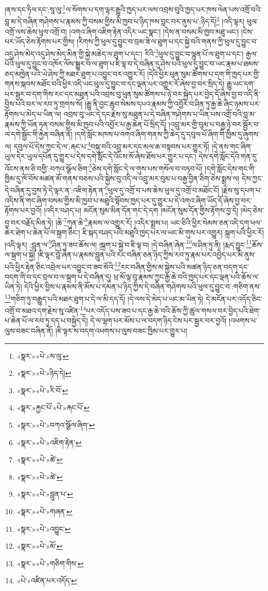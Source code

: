 །ནས་དང་ཏིལ་དང་:སཱ་ལུ་\footnote{«སྣར་»«པེ་»ས་ལུ་}ལ་སོགས་པ་དག་ལྟར་རྒྱུའི་ཁྱད་པར་ལས་འབྲས་བུའི་ཁྱད་པར་ཁས་ལེན་པས་འགྲོ་བའི་བླ་མ་དེ་བཞིན་གཤེགས་པ་རྣམས་ཀྱི་བསམ་གྱིས་མི་ཁྱབ་པ་ཉིད་ཁས་བླང་བར་ནུས་པ་:ཉིད་དོ།\footnote{«སྣར་»«པེ་»ཉིད་དེ།} །འདི་ལྟར། ཕུལ་འགྲོ་ལས་ཆེས་ཕུལ་འགྲོ་བ། །འགའ་ཞིག་འཇིག་རྟེན་འདིར་ཡང་སྣང་། །དེས་ན་བསམ་མི་ཁྱབ་མཐུ་ཡང་། །ངེས་པར་ཡོད་ཅེས་རྟོགས་པར་གྱིས། །རིགས་ཀྱི་ཕུལ་དུ་བྱུང་བ་བྲམ་ཟེ་ལ་ཐུག་པ་དང་སྐྱེ་བའི་གནས་ཀྱི་ཕུལ་དུ་བྱུང་བ་འདུ་ཤེས་མེད་འདུ་ཤེས་མེད་མིན་གྱི་སྐྱེ་མཆེད་ལ་ཐུག་པ་དང་། རིའི་\footnote{«སྣར་»«པེ་»རི་བོ་}ཕུལ་དུ་བྱུང་བ་ལྷུན་པོ་ལ་ཐུག་པ་དང་། རྒྱལ་པོའི་ཕུལ་དུ་བྱུང་བ་འཁོར་ལོས་སྒྱུར་བ་ལ་ཐུག་པ་ཇི་ལྟ་བ་དེ་བཞིན་དུ་ཤེས་པའི་ཕུལ་དུ་བྱུང་བ་ཡང་རྣམ་པ་ཐམས་ཅད་མཁྱེན་པའི་ཡེ་ཤེས་ཀྱི་མཐར་ཐུག་པ་འབྱུང་བར་འགྱུར་རོ། །དེའི་ཕྱིར་ཕུན་སུམ་ཚོགས་པ་དག་གི་ཁྱད་པར་གྱི་གནས་སྐབས་མཐོང་བའི་ཕྱིར་འདི་ཡང་ཕུལ་དུ་བྱུང་བ་དང་ལྡན་པར་འགྱུར་རོ་ཞེས་བྱ་བར་སྲིད་དེ། རྒྱུ་ཡང་དག་པར་སྦྱར་བ་དག་གིས་རང་དང་མཐུན་པའི་འབྲས་བུ་ཕུན་སུམ་ཚོགས་པ་ཉེ་བར་སྐྱེད་པར་བྱེད་དོ་ཞེས་བྱ་བ་འདི་ནི་བྱིས་པའི་བར་ལ་རབ་ཏུ་གྲགས་སོ། །རྒྱུ་ནི་བྱང་ཆུབ་སེམས་དཔའ་རྣམས་ཀྱི་འབྱོར་བ་ཤིན་ཏུ་རྒྱ་ཆེ་ཞིང་ཉམས་པར་རྟོགས་པ་མེད་པ་ཡིན་ལ། འབྲས་བུ་ཡང་དེ་དང་རྗེས་སུ་མཐུན་པ་དེ་བཞིན་གཤེགས་པ་ཡིན་པས་འགྲོ་བའི་བླ་མ་རྣམས་ཀྱི་ཡོན་ཏན་བསམ་གྱིས་མི་ཁྱབ་པའི་འབྱོར་པ་རྒྱ་ཆེན་པོ་སྲིད་དོ། །འབྲུ་མར་གྱི་བུམ་པ་བརྒྱ་ཉེ་བར་སྦྱོར་བ་ལ་དགེ་སྦྱོང་གི་རྐྱེན་བཞིན་ནོ། །དགེ་སློང་མཁས་པ་འགའ་ཞིག་གནས་ཀྱི་ཆེད་དུ་དབུལ་པོ་ཞིག་གི་ཁྱིམ་དུ་ཞུགས་ལ། དབུལ་པོ་དེས་ཀྱང་དེ་ལ་:རྐང་པ་\footnote{«སྣར་»རྐྱང་པོ་«པེ་»རྐང་པོ་}བསྐུ་བའི་འབྲུ་མར་དང་མལ་ཆ་བསྟབས་པར་གྱུར་ཏོ། །དེ་ནས་གང་ཞིག་ཡུལ་དེར་ཡུལ་དཔོན་དུ་གྱུར་པ་དེས་དགེ་སློང་དེ་འོངས་སོ་ཞེས་ཐོས་པར་གྱུར་པ་དང་། དེས་དགེ་སློང་དེའི་གན་དུ་འོངས་ནས་ཅི་བགྱི་:བཀའ་སྩོལ་ཅིག་\footnote{«སྣར་»«པེ་»བཀའ་སྩོལ་ཞིག་}ཅེས་དགེ་སློང་དེ་ལ་གུས་པས་གསོལ་བ་བཏབ་པོ། །དགེ་སློང་དེས་གང་གི་ཁྱིམ་དུ་ཁོ་བོས་མཚན་མོ་གནས་བཅས་པའི་སྐྱེས་བུ་འདི་ལ་འབྲུ་མར་བུམ་པ་བརྒྱ་བྱིན་ཅིག་ཅེས་སྨྲས་ལ། དེས་ཀྱང་དེ་བཞིན་དུ་བྱས་ཏེ་དེ་ལྟར་ན་:འཇིག་རྟེན་ན་\footnote{«སྣར་»«པེ་»འཇིག་རྟེན་}ཕུལ་དུ་འགྲོ་བ་པས་ཆེས་ཕུལ་དུ་འགྲོ་བ་མཐོང་ངོ། །རྗེས་སུ་དཔག་པ་འདིས་ནི་གང་ཞིག་བསམ་གྱིས་མི་ཁྱབ་པ་མཐུའི་སྟོབས་ཁྱད་པར་དུ་གྱུར་པ་དེ་འགའ་ཞིག་ཡོད་དོ་ཞེས་བྱ་བར་རྟོགས་པར་བྱའོ། །འདིར་བཤད་པ། མངོན་སུམ་མིན་དོན་གང་དེ་དག །མངོན་སུམ་དོན་གྱིས་རྟོགས་བྱ་དེ། །མེད་ཅེས་བྱ་བར་བརྗོད་མིན་ཏེ། །ཆེ་\footnote{«སྣར་»«པེ་»ཚེ་}ཀུན་ཆེ་\footnote{«སྣར་»«པེ་»ཚེ་}རྣམས་ལ་འགྱུར་རོ། །འདིར་སྨྲས་པ། ཡང་ཅིའི་ཕྱིར་སེམས་ཅན་འདི་དག་ཕལ་ཆེར་ཐེག་པ་ཆེན་པོ་ལ་སྐྲག་ཅིང་། ཇི་སྐད་བཤད་པའི་མཐུའི་ཁྱད་པར་ལ་ཡང་མི་གུས་པར་འགྱུར། སྐྲག་པའི་ཕྱིར་རོ། །འདི་ལྟར། :བླུན་ལ་\footnote{«སྣར་»«པེ་»བླུན་པ་}ཤིན་ཏུ་ཟབ་ཆོས་ལ། །སྐྲག་པ་སྐྱེ་བ་ཇི་ལྟ་བ། །དེ་བཞིན་ཞེན་\footnote{«སྣར་»«པེ་»གཞན་}ལ་ཤིན་ཏུ་ནི། །རྨད་བྱུང་\footnote{«སྣར་»«པེ་»འབྱུང་}ཆོས་ལ་སྐྲག་པ་སྐྱེ། །ཇི་ལྟར་བློ་ཞེན་པ་རྣམས་བླུན་པའི་རང་བཞིན་ཅན་ཉིད་ཀྱིས་རབ་ཏུ་རྣམ་པར་འབྱེད་པར་མི་ནུས་པའི་ཕྱིར་རྟེན་ཅིང་འབྲེལ་པར་འབྱུང་བ་ཟབ་མོའི་\footnote{«སྣར་»«པེ་»མོ་}རང་བཞིན་གྱིས་མ་སྐྱེས་པའི་མཚན་ཉིད་ཅན་བདག་དང་བདག་གི་བ་དང་བྲལ་བ་ལ་སྐྲག་པ་དེ་བཞིན་དུ། ཕྲ་མོ་ལྟ་བུ་རྣམས་ཀྱང་རྒྱ་ཆེ་བའི་ཁྱད་པར་དང་ལྡན་པའི་ཆོས་ལ་ཡིན་ཏེ། དེའི་ཕྱིར་བྱིས་པ་རྣམས་ནི་མོས་པ་དམན་པ་ཉིད་ཀྱིས་དེ་བཞིན་གཤེགས་པའི་ཕུལ་དུ་བྱུང་བ་:གཅིག་ནས་\footnote{«སྣར་»«པེ་»གཅིག་གིས་}གཅིག་ཏུ་བརྒྱུད་པའི་མཐར་ཐུག་པ་དེ་ལ་མི་དད་དོ། །དེ་ལས་དེ་མེད་པ་ཡང་མ་ཡིན་ཏེ། དེ་མངོན་པར་འདོད་ཅིང་འགྲོ་བ་མཐའ་དག་རྗེས་སུ་འཛིན་\footnote{«པེ་»འཛིན་པར་འདོད་}པར་འདོད་པས་ཟབ་པ་དང་རྒྱ་ཆེ་བའི་ཆོས་ཀྱི་ཚུལ་གསལ་བར་བྱེད་པའི་ཐེག་པ་ཆེན་པོ་ལ་རབ་ཏུ་དད་པ་བསྐྱེད་དེ། དེ་ལ་ལྷག་པར་མོས་པ་ལ་བདག་ཉིད་ངེས་པར་སྦྱར་བར་བྱའོ། །འཕགས་པ་ལུས་བཟང་བཞིན་ནོ། །ཇི་ལྟར་ས་བདག་འཕགས་པ་ལུས་བཟང་ཁྱིམ་པར་གྱུར་པ། 